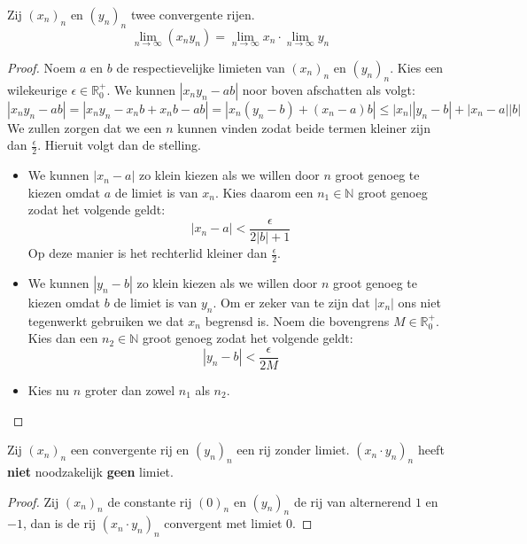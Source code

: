 \documentclass[main.tex]{subfiles}
\begin{document}
\begin{bst}
  \label{st:product-van-limieten-is-limiet-van-product}
  Zij $(x_{n})_{n}$ en $(y_{n})_{n}$ twee convergente rijen.
  \[ \lim_{n \rightarrow \infty}(x_{n}y_{n}) = \lim_{n\rightarrow \infty}x_{n} \cdot \lim_{n\rightarrow \infty}y_{n} \]

  \begin{proof}
    Noem $a$ en $b$ de respectievelijke limieten van $(x_{n})_{n}$ en $(y_{n})_{n}$.
    Kies een wilekeurige $\epsilon \in \mathbb{R}_{0}^{+}$.
    We kunnen $|x_{n}y_{n}-ab|$ noor boven afschatten als volgt:
    \[ |x_{n}y_{n}-ab| = |x_{n}y_{n} -x_{n}b + x_{n}b -ab| = |x_{n}(y_{n}-b) + (x_{n}-a)b| \le |x_{n}||y_{n}-b| + |x_{n}-a||b| \]
    We zullen zorgen dat we een $n$ kunnen vinden zodat beide termen kleiner zijn dan $\frac{\epsilon}{2}$. Hieruit volgt dan de stelling.
    \begin{itemize}
    \item We kunnen $|x_{n}-a|$ zo klein kiezen als we willen door $n$ groot genoeg te kiezen omdat $a$ de limiet is van $x_{n}$.
      Kies daarom een $n_{1}\in\mathbb{N}$ groot genoeg zodat het volgende geldt:
      \[ |x_{n}-a| < \frac{\epsilon}{2|b|+1} \]
      Op deze manier is het rechterlid kleiner dan $\frac{\epsilon}{2}$.
    \item We kunnen $|y_{n}-b|$ zo klein kiezen als we willen door $n$ groot genoeg te kiezen omdat $b$ de limiet is van $y_{n}$.
      Om er zeker van te zijn dat $|x_{n}|$ ons niet tegenwerkt gebruiken we dat $x_{n}$ begrensd is.
      Noem die bovengrens $M\in\mathbb{R}_{0}^{+}$.
      Kies dan een $n_{2}\in\mathbb{N}$ groot genoeg zodat het volgende geldt:
      \[ |y_{n}-b| < \frac{\epsilon}{2M} \]
    \item Kies nu $n$ groter dan zowel $n_{1}$ als $n_{2}$.
    \end{itemize}
  \end{proof}
\end{bst}

\begin{tvb}
  Zij $(x_{n})_{n}$ een convergente rij en $(y_{n})_{n}$ een rij zonder limiet.
  $(x_{n}\cdot y_{n})_{n}$ heeft \textbf{niet} noodzakelijk \textbf{geen} limiet.

  \begin{proof}
    Zij $(x_{n})_{n}$ de constante rij $(0)_{n}$ en $(y_{n})_{n}$ de rij van alternerend $1$ en $-1$, dan is de rij $(x_{n}\cdot y_{n})_{n}$ convergent met limiet $0$.
  \end{proof}
\end{tvb}
  
\end{document}
